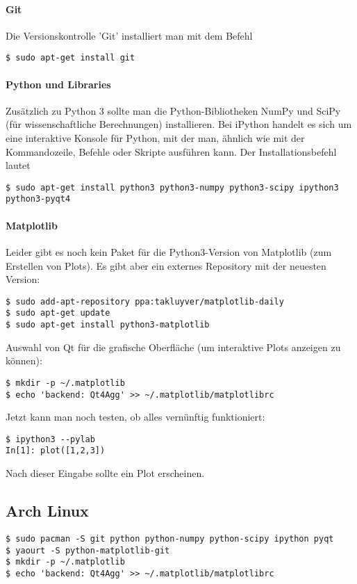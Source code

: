 \paragraph{Git}
Die Versionskontrolle 'Git' installiert man mit dem Befehl
\begin{verbatim}
$ sudo apt-get install git
\end{verbatim}

\paragraph{Python und Libraries}
Zusätzlich zu Python 3 sollte man die Python-Bibliotheken NumPy und SciPy (für wissenschaftliche Berechnungen) installieren.
Bei iPython handelt es sich um eine interaktive Konsole für Python, mit der man, ähnlich wie mit der Kommandozeile, Befehle oder Skripte ausführen kann.
Der Installationsbefehl lautet
\begin{verbatim}
$ sudo apt-get install python3 python3-numpy python3-scipy ipython3 python3-pyqt4
\end{verbatim}

\paragraph{Matplotlib}
Leider gibt es noch kein Paket für die Python3-Version von Matplotlib (zum Erstellen von Plots).
Es gibt aber ein externes Repository mit der neuesten Version:
\begin{verbatim}
$ sudo add-apt-repository ppa:takluyver/matplotlib-daily
$ sudo apt-get update
$ sudo apt-get install python3-matplotlib
\end{verbatim}

Auswahl von Qt für die grafische Oberfläche (um interaktive Plots anzeigen zu können):
\begin{verbatim}
$ mkdir -p ~/.matplotlib
$ echo 'backend: Qt4Agg' >> ~/.matplotlib/matplotlibrc
\end{verbatim}

Jetzt kann man noch testen, ob alles vernünftig funktioniert:
\begin{verbatim}
$ ipython3 --pylab
In[1]: plot([1,2,3])
\end{verbatim}
Nach dieser Eingabe sollte ein Plot erscheinen.

\subsection{Arch Linux}
\begin{verbatim}
$ sudo pacman -S git python python-numpy python-scipy ipython pyqt
$ yaourt -S python-matplotlib-git
$ mkdir -p ~/.matplotlib
$ echo 'backend: Qt4Agg' >> ~/.matplotlib/matplotlibrc
\end{verbatim}
